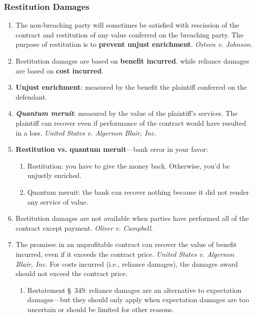 \subsubsection{Restitution Damages}

\begin{enumerate}
    \item The non-breaching party will sometimes be satisfied with rescission 
    of the contract and restitution of any value conferred on the breaching 
    party. The purpose of restitution is to \textbf{prevent unjust 
    enrichment}. \emph{Osteen v. Johnson}.
    \item Restitution damages are based on \textbf{benefit incurred}. while 
    reliance damages are based on \textbf{cost incurred}.
    \item \textbf{Unjust enrichment}: measured by the benefit the plaintiff 
    conferred on the defendant.
    \item \textbf{\emph{Quantum meruit}}: measured by the value of the 
    plaintiff's services. The plaintiff can recover even if performance of the 
    contract would have resulted in a loss. \emph{United States v. Algernon 
    Blair, Inc.}
    \item \textbf{Restitution vs. quantum meruit}---bank error in your favor:
    \begin{enumerate}
        \item Restitution: you have to give the money back. Otherwise, you'd 
        be unjustly enriched.
        \item Quantum meruit: the bank can recover nothing because it did not 
        render any service of value.
    \end{enumerate}
    \item Restitution damages are not available when parties have performed 
    all of the contract except payment. \emph{Oliver v. Campbell}.
    \item The promisee in an unprofitable contract can recover the value of 
    benefit incurred, even if it exceeds the contract price. \emph{United 
    States v. Algernon Blair, Inc.} For costs incurred (i.e., reliance 
    damages), the damages award should not exceed the contract price.
    \begin{enumerate}
        \item Restatement \S\ 349: reliance damages are an alternative 
        to expectation damages---but they should only apply when expectation 
        damages are too uncertain or should be limited for other reasons.

\end{enumerate}
\end{enumerate}
